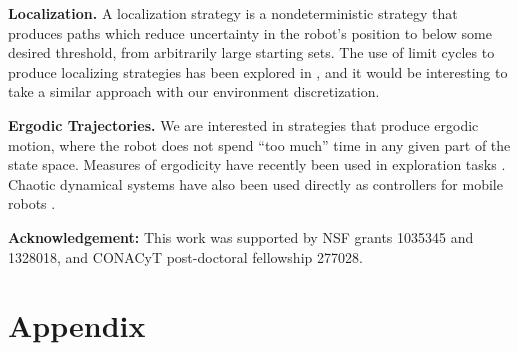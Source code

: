 \documentclass[]{styles/svproc}  %
\begin{document}
\textbf{Localization.} A localization strategy is a nondeterministic strategy that 
produces paths which reduce uncertainty in the robot's position to below some
desired threshold, from arbitrarily large starting sets. The use of limit cycles
to produce localizing strategies has been explored in \cite{alam2018space}, and
it would be interesting to take a similar approach with our environment
discretization.

\textbf{Ergodic Trajectories.} 
We are interested in strategies that produce ergodic motion, where the robot
does not spend ``too much'' time in any given part of the state space. Measures
of ergodicity have recently been used in exploration tasks
\cite{miller2016ergodic}. Chaotic dynamical systems have also been used directly
as controllers for mobile robots \cite{nakamura2001chaotic}.


\textbf{Acknowledgement:} This work was supported by NSF grants 1035345 and 1328018, and CONACyT
post-doctoral fellowship 277028.

\vspace{-1em}





\newpage
\section{Appendix}
\end{document}
